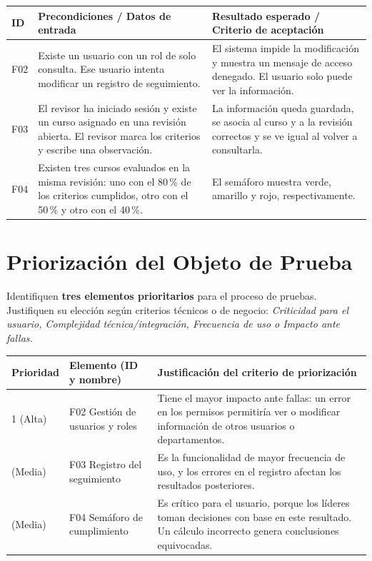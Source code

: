 \documentclass[11pt,letterpaper]{article}
\begin{document}
\vspace{4pt}
\noindent
\begin{tabularx}{\textwidth}{@{}P{0.9cm}YY@{}}
\toprule
\textbf{ID} & \textbf{Precondiciones / Datos de entrada} & \textbf{Resultado esperado / Criterio de aceptación} \\
\midrule
F02 & Existe un usuario con un rol de solo consulta. Ese usuario intenta modificar un registro de seguimiento. & El sistema impide la modificación y muestra un mensaje de acceso denegado. El usuario solo puede ver la información. \\
\addlinespace
F03 & El revisor ha iniciado sesión y existe un curso asignado en una revisión abierta. El revisor marca los criterios y escribe una observación. & La información queda guardada, se asocia al curso y a la revisión correctos y se ve igual al volver a consultarla. \\
\addlinespace
F04 & Existen tres cursos evaluados en la misma revisión: uno con el 80\,\% de los criterios cumplidos, otro con el 50\,\% y otro con el 40\,\%. & El semáforo muestra verde, amarillo y rojo, respectivamente. \\
\bottomrule
\end{tabularx}

\section{Priorización del Objeto de Prueba}
Identifiquen \textbf{tres elementos prioritarios} para el proceso de pruebas. Justifiquen su elección según criterios técnicos o de negocio: \textit{Criticidad para el usuario, Complejidad técnica/integración, Frecuencia de uso o Impacto ante fallas.}

\vspace{4pt}
\noindent
\begin{tabularx}{\textwidth}{@{}P{1.9cm}P{4.2cm}Y@{}}
\toprule
\textbf{Prioridad} & \textbf{Elemento (ID y nombre)} & \textbf{Justificación del criterio de priorización} \\
 (Alta) & F02 Gestión de usuarios y roles & Tiene el mayor impacto ante fallas: un error en los permisos permitiría ver o modificar información de otros usuarios o departamentos. \\
 (Media) & F03 Registro del seguimiento & Es la funcionalidad de mayor frecuencia de uso, y los errores en el registro afectan los resultados posteriores. \\
 (Media) & F04 Semáforo de cumplimiento & Es crítico para el usuario, porque los líderes toman decisiones con base en este resultado. Un cálculo incorrecto genera conclusiones equivocadas. \\
\bottomrule
\end{tabularx}
\end{document}
